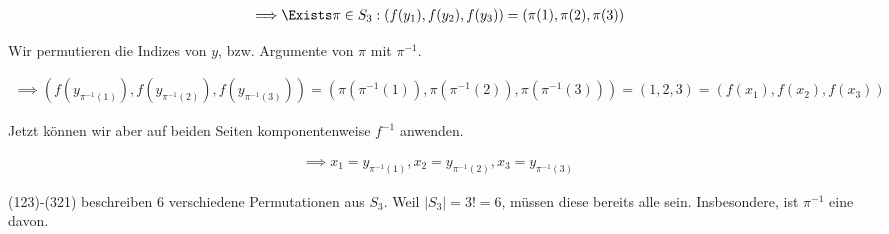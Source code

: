 \begin{solution}
\begin{enumerate}[label = \alph*.]
\begin{itemize}
        \begin{align*}
            \implies
            & \Exists \pi \in S_3: (f(y_1), f(y_2), f(y_3)) = (\pi(1), \pi(2), \pi(3)) \\
        \end{align*}

        Wir permutieren die Indizes von $y$, bzw. Argumente von $\pi$ mit $\pi^{-1}$.

        \begin{align*}
            \implies
            (f(y_{\pi^{-1}(1)}), f(y_{\pi^{-1}(2)}), f(y_{\pi^{-1}(3)}))
            =
            (\pi(\pi^{-1}(1)), \pi(\pi^{-1}(2)), \pi(\pi^{-1}(3)))
            =
            (1, 2, 3)
            =
            (f(x_1), f(x_2), f(x_3))
        \end{align*}

        Jetzt können wir aber auf beiden Seiten komponentenweise $f^{-1}$ anwenden.

        \begin{align*}
            \implies
            x_1 = y_{\pi^{-1}(1)},
            x_2 = y_{\pi^{-1}(2)},
            x_3 = y_{\pi^{-1}(3)}
        \end{align*}

        (123)-(321) beschreiben $6$ verschiedene Permutationen aus $S_3$.
        Weil $|S_3| = 3! = 6$, müssen diese bereits alle sein.
        Insbesondere, ist $\pi^{-1}$ eine davon.

    \end{itemize}

\end{enumerate}

\end{solution}


